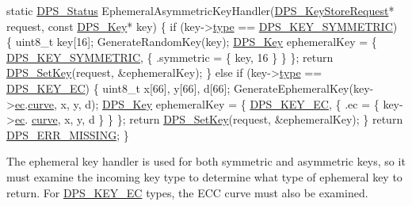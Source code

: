 \begin{DoxyCodeInclude}
\textcolor{keyword}{static} \hyperlink{group__status_ga30395a84d3cad9d4ec29848106415038}{DPS\_Status} EphemeralAsymmetricKeyHandler(\hyperlink{group__keystore_ga7c3e50965b65334e9791780fa855ed16}{DPS\_KeyStoreRequest}* request, \textcolor{keyword}{
      const} \hyperlink{struct___d_p_s___key}{DPS\_Key}* key)
\{
    \textcolor{keywordflow}{if} (key->\hyperlink{struct___d_p_s___key_a347677e64145828ed5b1191a8fdc71d5}{type} == \hyperlink{group__keystore_gga7ca1045749c725e9c4a1b4758b2a0196a662c1e84628d96be8ae08163af382392}{DPS\_KEY\_SYMMETRIC}) \{
        uint8\_t key[16];
        GenerateRandomKey(key);
        \hyperlink{struct___d_p_s___key}{DPS\_Key} ephemeralKey = \{ \hyperlink{group__keystore_gga7ca1045749c725e9c4a1b4758b2a0196a662c1e84628d96be8ae08163af382392}{DPS\_KEY\_SYMMETRIC}, \{ .symmetric = \{ key, 16 \} \} \};
        \textcolor{keywordflow}{return} \hyperlink{group__keystore_ga15d6a9b8256b67c2ec8b1d365a98dbab}{DPS\_SetKey}(request, &ephemeralKey);
    \} \textcolor{keywordflow}{else} \textcolor{keywordflow}{if} (key->\hyperlink{struct___d_p_s___key_a347677e64145828ed5b1191a8fdc71d5}{type} == \hyperlink{group__keystore_gga7ca1045749c725e9c4a1b4758b2a0196a58453a89367757e523ac337232387d89}{DPS\_KEY\_EC}) \{
        uint8\_t x[66], y[66], d[66];
        GenerateEphemeralKey(key->\hyperlink{struct___d_p_s___key_a8cf482ff4fe81b774462469c5da9295f}{ec}.\hyperlink{struct___d_p_s___key_e_c_a9896c40cd0b6dd0bd05ac5831fc421d9}{curve}, x, y, d);
        \hyperlink{struct___d_p_s___key}{DPS\_Key} ephemeralKey = \{ \hyperlink{group__keystore_gga7ca1045749c725e9c4a1b4758b2a0196a58453a89367757e523ac337232387d89}{DPS\_KEY\_EC}, \{ .ec = \{ key->\hyperlink{struct___d_p_s___key_a8cf482ff4fe81b774462469c5da9295f}{ec}.
      \hyperlink{struct___d_p_s___key_e_c_a9896c40cd0b6dd0bd05ac5831fc421d9}{curve}, x, y, d \} \} \};
        \textcolor{keywordflow}{return} \hyperlink{group__keystore_ga15d6a9b8256b67c2ec8b1d365a98dbab}{DPS\_SetKey}(request, &ephemeralKey);
    \}
    \textcolor{keywordflow}{return} \hyperlink{group__status_ga5c46980c33492a8b76bffce081dbcba4}{DPS\_ERR\_MISSING};
\}
\end{DoxyCodeInclude}
The ephemeral key handler is used for both symmetric and asymmetric keys, so it must examine the incoming {\ttfamily key} type to determine what type of ephemeral key to return. For \hyperlink{group__keystore_gga7ca1045749c725e9c4a1b4758b2a0196a58453a89367757e523ac337232387d89}{D\+P\+S\+\_\+\+K\+E\+Y\+\_\+\+EC} types, the E\+CC curve must also be examined.

